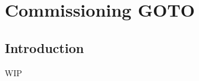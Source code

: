 \chapter{Commissioning GOTO}
\label{chap:commissioning}
\chaptoc{}


\newpage
\section{Introduction}
\label{sec:commissioning_intro}
\begin{colsection}


\begin{colsection}

WIP

\end{colsection}


\end{colsection}


\newpage
